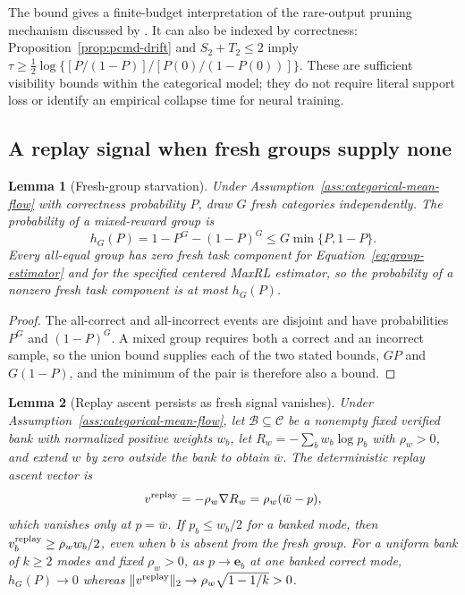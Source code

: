 \documentclass{article}
\newcommand{\enforcehalffinalproseline}{%
  \setlength{\parfillskip}{0pt plus .20\linewidth}}
\newcommand{\1}{\mathbf 1}
\newtheorem{lemma}{Lemma}[section]
\theoremstyle{remark}
\theoremstyle{definition}
\theoremstyle{plain}
\begin{document}
The bound gives a finite-budget interpretation of the rare-output pruning
mechanism discussed by \citet[Section~4.2.5]{lochab2026ucpo}.
It can also be indexed by correctness: Proposition~\ref{prop:pcmd-drift}
and $S_2+T_2\le2$ imply
$\tau\ge\tfrac12\log\{[P/(1-P)]/[P(0)/(1-P(0))]\}$.
These are sufficient visibility bounds within the categorical model;
they do not require literal support loss or identify an empirical collapse
time for neural training.


\subsection{A replay signal when fresh groups supply none}
\label{app:theory-gradient-availability}

\begin{lemma}[Fresh-group starvation]
\enforcehalffinalproseline
\label{lem:replay-gradient-availability}
Under Assumption~\ref{ass:categorical-mean-flow} with correctness probability
$P$, draw $G$ fresh categories independently. The probability of a
mixed-reward group is
\[
 h_G(P)=1-P^G-(1-P)^G\le G\min\{P,1-P\}.
\]
Every all-equal group has zero fresh task component for
Equation~\eqref{eq:group-estimator} and for the specified centered MaxRL
estimator, so the probability of a nonzero fresh task component is at most $h_G(P)$.
\end{lemma}

\begin{proof}
\enforcehalffinalproseline
The all-correct and all-incorrect events are disjoint and have probabilities
$P^G$ and $(1-P)^G$. A mixed group requires both a correct and an incorrect
sample, so the union bound supplies each of the two stated bounds, $GP$ and
$G(1-P)$, and the minimum of the pair is therefore also a bound.
\end{proof}

\begin{lemma}[Replay ascent persists as fresh signal vanishes]
\enforcehalffinalproseline
\label{lem:replay-ascent}
Under Assumption~\ref{ass:categorical-mean-flow}, let
$\mathcal B\subseteq\mathcal C$ be a nonempty fixed verified bank with
normalized positive weights $w_b$, let $R_w=-\sum_b w_b\log p_b$ with
$\rho_w>0$, and extend $w$ by zero outside the bank to obtain $\bar w$. The
deterministic replay ascent vector is
\[
 v^{\rm replay}=-\rho_w\nabla R_w=\rho_w(\bar w-p),
\]
which vanishes only at $p=\bar w$. If $p_b\le w_b/2$ for a banked mode, then
$v^{\rm replay}_b\ge\rho_w w_b/2$, even when $b$ is absent from the fresh
group. For a uniform bank of $k\ge2$ modes and fixed $\rho_w>0$, as
$p\to\mathbf e_b$ at one banked correct mode, $h_G(P)\to0$ whereas
$\|v^{\rm replay}\|_2\to\rho_w\sqrt{1-1/k}>0$.
\end{lemma}
\end{document}
